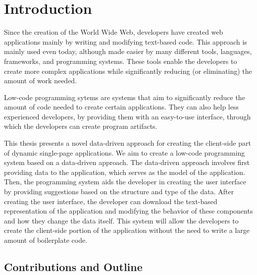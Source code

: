 \chapter*{Introduction}

Since the creation of the World Wide Web, developers have created web applications mainly by writing and modifying text-based code.
This approach is mainly used even today, although made easier by many different tools, languages, frameworks, and programming systems.
These tools enable the developers to create more complex applications while significantly reducing (or eliminating) the amount of work needed.

Low-code programming sytems are systems that aim to significantly reduce the amount of code needed to create certain applications.
They can also help less experienced developers, by providing them with an easy-to-use interface, through which the developers can create program artifacts.


This thesis presents a novel data-driven approach for creating the client-side part of dynamic single-page applications.
We aim to create a low-code programming system based on a data-driven approach.
The data-driven approach involves first providing data to the application, which serves as the model of the application.
Then, the programming system aids the developer in creating the user interface by providing suggestions based on the structure and type of the data.
After creating the user interface, the developer can download the text-based representation of the application and modifying the behavior of these components and how they change the data itself.
This system will allow the developers to create the client-side portion of the application without the need to write a large amount of boilerplate code.


\section* {Contributions and Outline}


